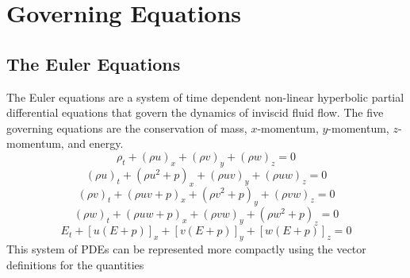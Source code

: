 \chapter{Governing Equations}\label{ch:GovEq}
\section{The Euler Equations}
The Euler equations are a system of time dependent non-linear hyperbolic partial differential equations that govern the dynamics of inviscid fluid flow. The five governing equations are the conservation of mass, $x$-momentum, $y$-momentum, $z$-momentum, and energy.
\begin{equation}
	\rho_t  + \left(\rho u\right)_x  + \left(\rho v\right)_y  + \left(\rho w\right)_z = 0
\end{equation}
\begin{equation}
	\left(\rho u\right)_t + \left(\rho u^2 + p\right)_x + \left(\rho u v\right)_y + \left(\rho u w\right)_z = 0
\end{equation}
\begin{equation}
	\left(\rho v\right)_t + \left(\rho u v + p\right)_x + \left(\rho v^2 + p\right)_y + \left(\rho v w\right)_z = 0
\end{equation}
\begin{equation}
	\left(\rho w\right)_t + \left(\rho u w + p\right)_x + \left(\rho v w\right)_y + \left(\rho w^2 + p\right)_z = 0
\end{equation}
\begin{equation}
	E_t + \left[u\left(E + p\right)\right]_x + \left[v\left(E + p\right)\right]_y + \left[w\left(E + p\right)\right]_z = 0
\end{equation}
This system of PDEs can be represented more compactly using the vector definitions for the quantities
